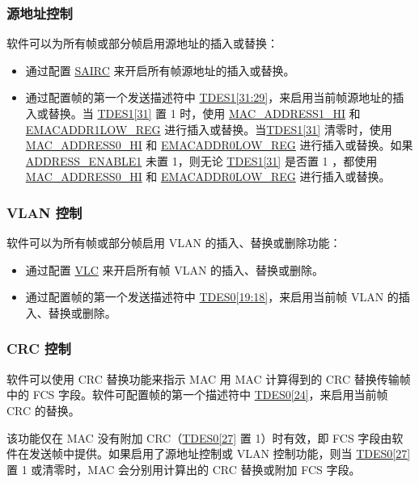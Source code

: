 \documentclass[main\_\_CN.tex]{subfiles}
\begin{document}
\subsubsection{源地址控制}
软件可以为所有帧或部分帧启用源地址的插入或替换：
\begin{itemize}
\item 通过配置 \hyperref[regdesc:EMACCONFIGREG]{SAIRC} 来开启所有帧源地址的插入或替换。
\item 通过配置帧的第一个发送描述符中 \hyperref[tab:ethernetmac-TDES1]{TDES1[31:29]}，来启用当前帧源地址的插入或替换。当 \hyperref[tab:ethernetmac-TDES1]{TDES1[31]} 置 1 时，使用 \hyperref[regdesc:EMACADDR1HIGHREG]{MAC\_ADDRESS1\_HI} 和 \hyperref[regdesc:EMACADDR1LOWREG]{EMACADDR1LOW\_REG} 进行插入或替换。当\hyperref[tab:ethernetmac-TDES1]{TDES1[31]} 清零时，使用 \hyperref[regdesc:EMACADDR0HIGHREG]{MAC\_ADDRESS0\_HI} 和 \hyperref[regdesc:EMACADDR0LOWREG]{EMACADDR0LOW\_REG} 进行插入或替换。如果 \hyperref[regdesc:EMACADDR1HIGHREG]{ADDRESS\_ENABLE1} 未置 1，则无论 \hyperref[tab:ethernetmac-TDES1]{TDES1[31]} 是否置 1 ，都使用 \hyperref[regdesc:EMACADDR0HIGHREG]{MAC\_ADDRESS0\_HI} 和 \hyperref[regdesc:EMACADDR0LOWREG]{EMACADDR0LOW\_REG} 进行插入或替换。
\end{itemize}

\subsubsection{VLAN 控制}
软件可以为所有帧或部分帧启用 VLAN 的插入、替换或删除功能：
\begin{itemize}
\item 通过配置 \hyperref[regdesc:EMACTXVLANTAGCONTROLREG]{VLC} 来开启所有帧 VLAN 的插入、替换或删除。
\item 通过配置帧的第一个发送描述符中 \hyperref[tab:ethernetmac-TDES0]{TDES0[19:18]}，来启用当前帧 VLAN 的插入、替换或删除。
\end{itemize}

\subsubsection{CRC 控制}
软件可以使用 CRC 替换功能来指示 MAC 用 MAC 计算得到的 CRC 替换传输帧中的 FCS 字段。软件可配置帧的第一个描述符中 \hyperref[tab:ethernetmac-TDES0]{TDES0[24]}，来启用当前帧 CRC 的替换。

该功能仅在 MAC 没有附加 CRC（\hyperref[tab:ethernetmac-TDES0]{TDES0[27]} 置 1）时有效，即 FCS 字段由软件在发送帧中提供。如果启用了源地址控制或 VLAN 控制功能，则当 \hyperref[tab:ethernetmac-TDES0]{TDES0[27]} 置 1 或清零时，MAC 会分别用计算出的 CRC 替换或附加 FCS 字段。
\end{document}
